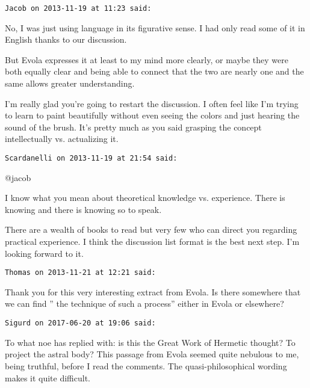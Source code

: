 \begin{footnotesize}
\begin{sffamily}
\hfill

\texttt{Jacob on 2013-11-19 at 11:23 said: }

No, I was just using language in its figurative sense. I had only read some of it in English thanks to our discussion. 

But Evola expresses it at least to my mind more clearly, or maybe they were both equally clear and being able to connect that the two are nearly one and the same allows greater understanding. 

I'm really glad you're going to restart the discussion. I often feel like I'm trying to learn to paint beautifully without even seeing the colors and just hearing the sound of the brush. It's pretty much as you said grasping the concept intellectually vs. actualizing it.


\hfill

\texttt{Scardanelli on 2013-11-19 at 21:54 said: }

@jacob

I know what you mean about theoretical knowledge vs. experience. There is knowing and there is knowing so to speak.

There are a wealth of books to read but very few who can direct you regarding practical experience. I think the discussion list format is the best next step. I'm looking forward to it.


\hfill

\texttt{Thomas on 2013-11-21 at 12:21 said: }

Thank you for this very interesting extract from Evola. Is there somewhere that we can find ” the technique of such a process” either in Evola or elsewhere?


\hfill

\texttt{Sigurd on 2017-06-20 at 19:06 said: }

To what noe has replied with: is this the Great Work of Hermetic thought? To project the astral body? This passage from Evola seemed quite nebulous to me, being truthful, before I read the comments. The quasi-philosophical wording makes it quite difficult.


\hfill


\end{sffamily}\end{footnotesize}
